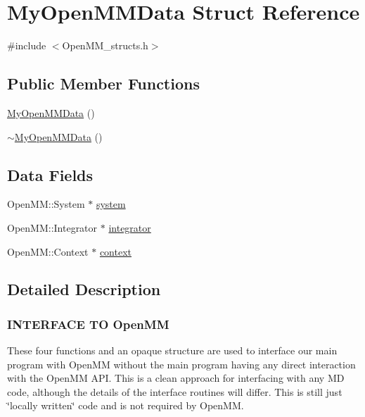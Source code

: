 \hypertarget{structMyOpenMMData}{}\section{My\+Open\+M\+M\+Data Struct Reference}
\label{structMyOpenMMData}


{\ttfamily \#include $<$Open\+M\+M\+\_\+structs.\+h$>$}

\subsection*{Public Member Functions}
\begin{DoxyCompactItemize}
\item 
\mbox{\hyperlink{structMyOpenMMData_ad91ea098216e5bbee8f0199d2a7e2c7d}{My\+Open\+M\+M\+Data}} ()
\item 
\mbox{\hyperlink{structMyOpenMMData_a8b18e9a40611765e2c966495e2a339bb}{$\sim$\+My\+Open\+M\+M\+Data}} ()
\end{DoxyCompactItemize}
\subsection*{Data Fields}
\begin{DoxyCompactItemize}
\item 
Open\+M\+M\+::\+System $\ast$ \mbox{\hyperlink{structMyOpenMMData_ad14c08e4c616766db92ae52e57b44480}{system}}
\item 
Open\+M\+M\+::\+Integrator $\ast$ \mbox{\hyperlink{structMyOpenMMData_a471489f3c9bd1e5a54fc5202b71b6b96}{integrator}}
\item 
Open\+M\+M\+::\+Context $\ast$ \mbox{\hyperlink{structMyOpenMMData_a2d94acedaa245a3fb2faa48625fa7fc1}{context}}
\end{DoxyCompactItemize}


\subsection{Detailed Description}


 \subsubsection*{I\+N\+T\+E\+R\+F\+A\+CE TO Open\+MM }

These four functions and an opaque structure are used to interface our main program with Open\+MM without the main program having any direct interaction with the Open\+MM A\+PI. This is a clean approach for interfacing with any MD code, although the details of the interface routines will differ. This is still just \char`\"{}locally written\char`\"{} code and is not required by Open\+MM.

